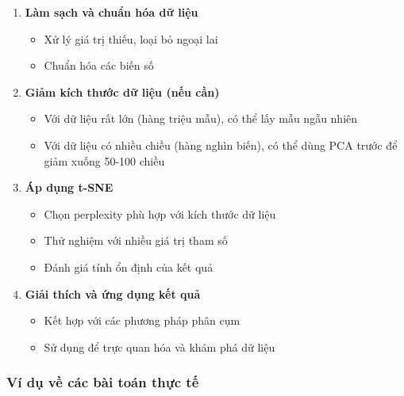 \documentclass[
]{article}
\providecommand{\tightlist}{%
  \setlength{\itemsep}{0pt}\setlength{\parskip}{0pt}}
\begin{document}
\begin{enumerate}
\def\labelenumi{\arabic{enumi}.}
\tightlist
\item
  \textbf{Làm sạch và chuẩn hóa dữ liệu}

  \begin{itemize}
  \tightlist
  \item
    Xử lý giá trị thiếu, loại bỏ ngoại lai
  \item
    Chuẩn hóa các biến số
  \end{itemize}
\item
  \textbf{Giảm kích thước dữ liệu (nếu cần)}

  \begin{itemize}
  \tightlist
  \item
    Với dữ liệu rất lớn (hàng triệu mẫu), có thể lấy mẫu ngẫu nhiên
  \item
    Với dữ liệu có nhiều chiều (hàng nghìn biến), có thể dùng PCA trước
    để giảm xuống 50-100 chiều
  \end{itemize}
\item
  \textbf{Áp dụng t-SNE}

  \begin{itemize}
  \tightlist
  \item
    Chọn perplexity phù hợp với kích thước dữ liệu
  \item
    Thử nghiệm với nhiều giá trị tham số
  \item
    Đánh giá tính ổn định của kết quả
  \end{itemize}
\item
  \textbf{Giải thích và ứng dụng kết quả}

  \begin{itemize}
  \tightlist
  \item
    Kết hợp với các phương pháp phân cụm
  \item
    Sử dụng để trực quan hóa và khám phá dữ liệu
  \end{itemize}
\end{enumerate}

\subsubsection{Ví dụ về các bài toán thực
tế}\label{vuxed-dux1ee5-vux1ec1-cuxe1c-buxe0i-touxe1n-thux1ef1c-tux1ebf}
\end{document}
